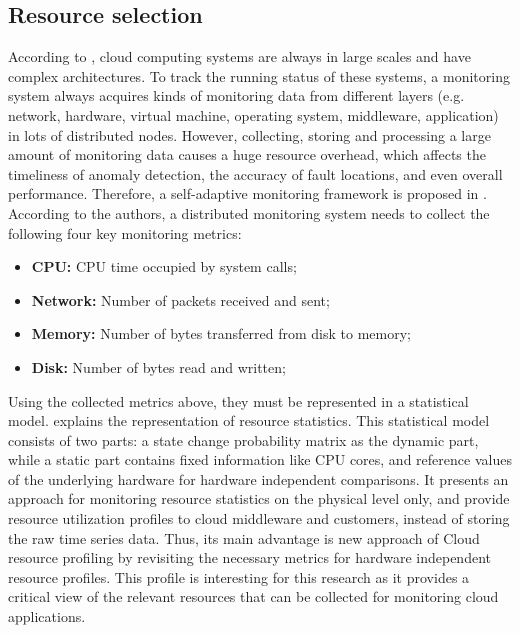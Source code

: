 \subsection{Resource selection} \label{sec:resource_selection}
According to \cite{wang2018self}, cloud computing systems are always in large scales and have complex architectures. To track the running status of these systems, a monitoring system always acquires kinds of monitoring data from different layers (e.g. network, hardware, virtual machine, operating system, middleware, application) in lots of distributed nodes. However, collecting, storing and processing a large amount of monitoring data causes a huge resource overhead, which affects the timeliness of anomaly detection, the accuracy of fault locations, and even overall performance. Therefore, a self-adaptive monitoring framework is proposed in \cite{wang2018self}. According to the authors, a distributed monitoring system needs to collect the following four key monitoring metrics:
\begin{itemize}
    \item \textbf{CPU: }CPU time occupied by system calls;
    \item \textbf{Network: }Number of packets received and sent;
    \item \textbf{Memory: }Number of bytes transferred from disk to memory;
    \item \textbf{Disk: }Number of bytes read and written;
\end{itemize}

\noindent
Using the collected metrics above, they must be represented in a statistical model. \cite{hauser2018reviewing} explains the representation of resource statistics. This statistical model consists of two parts: a state change probability matrix as the dynamic part, while a static part contains fixed information like CPU cores, and reference values of the underlying hardware for hardware independent comparisons. It presents an approach for monitoring resource statistics on the physical level only, and provide resource utilization profiles to cloud middleware and customers, instead of storing the raw time series data. Thus, its main advantage is new approach of Cloud resource profiling by revisiting the necessary metrics for hardware independent resource profiles. This profile is interesting for this research as it provides a critical view of the relevant resources that can be collected for monitoring cloud applications.\\


